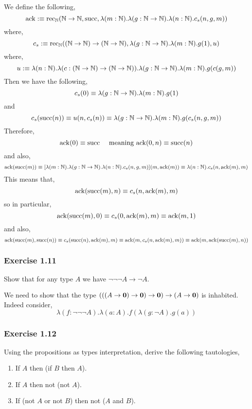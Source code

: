 \documentclass[12pt]{article}
\begin{document}
We define the following,
\[ \ack :\equiv \rec_{\N}(\N \to \N, \succ, \lambda (m : \N) . \lambda (g : \N \to \N) . \lambda (n : \N) . c_s(n, g, m)) \]
where,
\[ c_s :\equiv \rec_{\N}((\N \to \N) \to (\N \to \N), \lambda (g : \N \to \N) . \lambda (m : \N) . g(1), u) \]
where,
\[ u :\equiv \lambda (n : \N) . \lambda (c : (\N \to \N) \to (\N \to \N)) . \lambda (g : \N \to \N) . \lambda (m : \N) . g (c(g,m)) \]
Then we have the following,
\[ c_s(0) \equiv \lambda (g : \N \to \N) . \lambda (m : \N) . g(1) \]
and 
\[ c_s(\succ(n)) \equiv u(n, c_s(n)) \equiv \lambda (g : \N \to \N) . \lambda (m : \N) . g(c_s(n, g, m)) \]
Therefore,
\[ \ack(0) \equiv \succ \quad \text{ meaning } \ack(0, n) \equiv \succ(n) \]
and also,
\[ \ack(\succ(m)) \equiv [\lambda (m : \N) . \lambda (g : \N \to \N) . \lambda (n : \N) . c_s(n, g, m)](m, \ack(m)) \equiv \lambda (n : \N) . c_s(n, \ack(m), m) \]
This means that,
\[ \ack(\succ(m), n) \equiv c_s(n, \ack(m), m) \]
so in particular,
\[ \ack(\succ(m), 0) \equiv c_s(0, \ack(m), m) \equiv \ack(m, 1) \]
and also,
\[ \ack(\succ(m), \succ(n)) \equiv c_s(\succ(n), \ack(m), m) \equiv \ack(m, c_s(n, \ack(m), m)) \equiv \ack(m, \ack(\succ(m), n)) \]


\subsubsection{Exercise 1.11}

\begin{exercise}
Show that for any type $A$ we have $\neg \neg \neg A \to \neg A$. 
\end{exercise}

We need to show that the type $(((A \to \bf{0}) \to \bf{0}) \to \bf{0}) \to (A \to \bf{0})$ is inhabited. Indeed consider,
\[ \lambda (f : \neg \neg \neg A) . \lambda (a : A) . f( \lambda (g : \neg A) . g(a) ) \]

\subsubsection{Exercise 1.12}

\begin{exercise}
Using the propositions as types interpretation, derive the following tautologies,
\begin{enumerate}
\item If $A$ then (if $B$ then $A$).
\item If $A$ then not (not $A$).
\item If (not $A$ or not $B$) then not ($A$ and $B$).
\end{enumerate}
\end{exercise}
\end{document}
